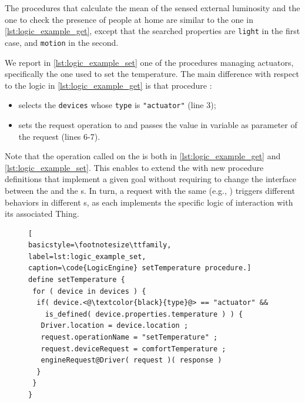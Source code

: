 The procedures that calculate the mean of the sensed external luminosity and
the one to check the presence of people at home are similar to the one in
\cref{lst:logic_example_get}, except that the searched properties are
\lstinline{light} in the first case, and \lstinline{motion} in the second.

We report in \cref{lst:logic_example_set} one of the procedures managing
actuators, specifically the one used to set the temperature. The main
difference with respect to the logic in \cref{lst:logic_example_get} is that
procedure :

\begin{itemize}
  \item selects the \lstinline{devices} whose {\small \texttt{type}} is
  \lstinline{"actuator"} (line 3);
  \item sets the request operation to  and passes the value
  in variable  as parameter of the request
  (lines 6-7).
\end{itemize}

Note that the operation called on the  is 
both in \cref{lst:logic_example_get} and \cref{lst:logic_example_set}. This
enables to extend the  with new procedure definitions that
implement a given goal without requiring to change the interface between the
 and the s. In turn, a request with the same
 (e.g., ) triggers different
behaviors in different s, as each implements the specific logic
of interaction with its associated Thing.
%
\begin{figure}[t]
\begin{lstlisting}[
basicstyle=\footnotesize\ttfamily,
label=lst:logic_example_set,
caption=\code{LogicEngine} setTemperature procedure.]
define setTemperature {
 for ( device in devices ) {
  if( device.<@\textcolor{black}{type}@> == "actuator" &&
    is_defined( device.properties.temperature ) ) {
   Driver.location = device.location ;
   request.operationName = "setTemperature" ;
   request.deviceRequest = comfortTemperature ;
   engineRequest@Driver( request )( response )
  }
 }
}
\end{lstlisting}
\end{figure}



